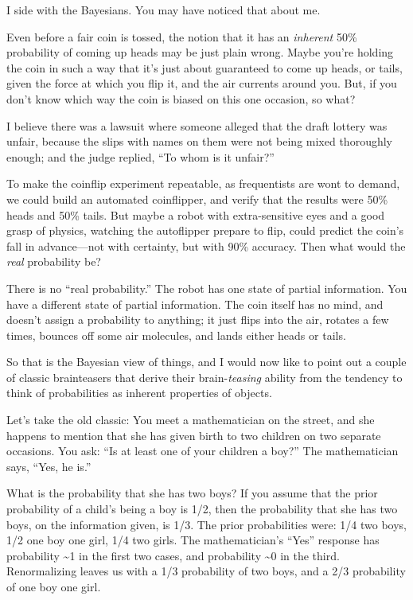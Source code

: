{
 I side with the Bayesians. You may have noticed that about me.}

{
 Even before a fair coin is tossed, the notion that it has an
\textit{inherent} 50\% probability of coming up heads may be just plain
wrong. Maybe you're holding the coin in such a way that
it's just about guaranteed to come up heads, or tails,
given the force at which you flip it, and the air currents around you.
But, if you don't know which way the coin is biased on
this one occasion, so what?}

{
 I believe there was a lawsuit where someone alleged that the draft
lottery was unfair, because the slips with names on them were not being
mixed thoroughly enough; and the judge replied, ``To
whom is it unfair?''}

{
 To make the coinflip experiment repeatable, as frequentists are
wont to demand, we could build an automated coinflipper, and verify
that the results were 50\% heads and 50\% tails. But maybe a robot with
extra-sensitive eyes and a good grasp of physics, watching the
autoflipper prepare to flip, could predict the coin's
fall in advance---not with certainty, but with 90\% accuracy. Then what
would the \textit{real} probability be?}

{
 There is no ``real
probability.'' The robot has one state of partial
information. You have a different state of partial information. The
coin itself has no mind, and doesn't assign a
probability to anything; it just flips into the air, rotates a few
times, bounces off some air molecules, and lands either heads or
tails.}

{
 So that is the Bayesian view of things, and I would now like to
point out a couple of classic brainteasers that derive their
brain-\textit{teasing} ability from the tendency to think of
probabilities as inherent properties of objects.}

{
 Let's take the old classic: You meet a
mathematician on the street, and she happens to mention that she has
given birth to two children on two separate occasions. You ask:
``Is at least one of your children a
boy?'' The mathematician says,
``Yes, he is.''}

{
 What is the probability that she has two boys? If you assume that
the prior probability of a child's being a boy is 1/2,
then the probability that she has two boys, on the information given,
is 1/3. The prior probabilities were: 1/4 two boys, 1/2 one boy one
girl, 1/4 two girls. The mathematician's
``Yes'' response has probability
\~{}1 in the first two cases, and probability \~{}0 in the third.
Renormalizing leaves us with a 1/3 probability of two boys, and a 2/3
probability of one boy one girl.}

